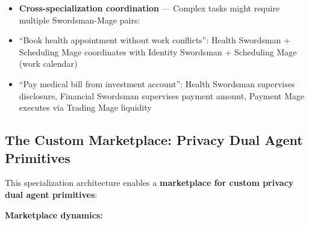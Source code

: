 \documentclass[
]{article}
\begin{document}
\begin{itemize}
  its domain's slice of the private ledger. Each Mage only receives
  authorization from whichever Swordsman is supervising that task. The
  server coordinates but no single agent sees the complete picture.
\item
  \textbf{Cross-specialization coordination} --- Complex tasks might
  require multiple Swordsman-Mage pairs:
\item
  ``Book health appointment without work conflicts'': Health Swordsman +
  Scheduling Mage coordinates with Identity Swordsman + Scheduling Mage
  (work calendar)
\item
  ``Pay medical bill from investment account'': Health Swordsman
  supervises disclosure, Financial Swordsman supervises payment amount,
  Payment Mage executes via Trading Mage liquidity
\end{itemize}

\subsection{The Custom Marketplace: Privacy Dual Agent
Primitives}\label{the-custom-marketplace-privacy-dual-agent-primitives}

This specialization architecture enables a \textbf{marketplace for
custom privacy dual agent primitives}:

\textbf{Marketplace dynamics:}
\end{document}
